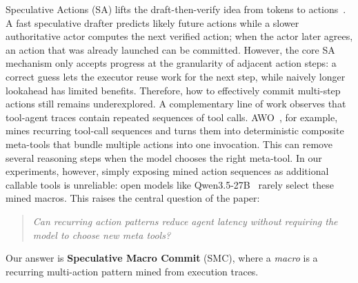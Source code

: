 Speculative Actions (SA) lifts the draft-then-verify idea from tokens to actions~\citep{speculative-actions-2026}. 
A fast speculative drafter predicts likely future actions while a slower authoritative actor computes the next verified action; when the actor later agrees, an action that was already launched can be committed. 
However, the core SA mechanism only accepts progress at the granularity of adjacent action steps: a correct guess lets the executor reuse work for the next step, while naively longer lookahead has limited benefits. 
Therefore, how to effectively commit multi-step actions still remains underexplored.
A complementary line of work observes that tool-agent traces contain repeated sequences of tool calls. 
AWO~\citep{awo-metatools-2026}, for example, mines recurring tool-call sequences and turns them into deterministic composite meta-tools that bundle multiple actions into one invocation. 
This can remove several reasoning steps when the model chooses the right meta-tool.
In our experiments, however, simply exposing mined action sequences as additional callable tools is unreliable: open models like Qwen3.5-27B~\citep{qwen3.5} rarely select these mined macros.
This raises the central question of the paper:
\begin{quote}
\emph{Can recurring action patterns reduce agent latency without requiring the model to choose new meta tools?}
\end{quote}
Our answer is \textbf{Speculative Macro Commit} (SMC), 
where a \emph{macro} is a recurring multi-action pattern mined from execution traces.
